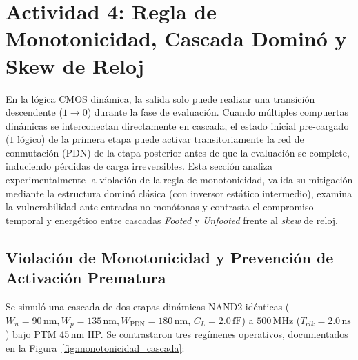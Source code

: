 \section{Actividad 4: Regla de Monotonicidad, Cascada Dominó y Skew de Reloj}
\label{sec:actividad4}

En la lógica CMOS dinámica, la salida solo puede realizar una transición descendente ($1 \to 0$) durante la fase de evaluación. Cuando múltiples compuertas dinámicas se interconectan directamente en cascada, el estado inicial pre-cargado ($1$ lógico) de la primera etapa puede activar transitoriamente la red de conmutación (PDN) de la etapa posterior antes de que la evaluación se complete, induciendo pérdidas de carga irreversibles. Esta sección analiza experimentalmente la violación de la regla de monotonicidad, valida su mitigación mediante la estructura dominó clásica (con inversor estático intermedio), examina la vulnerabilidad ante entradas no monótonas y contrasta el compromiso temporal y energético entre cascadas \textit{Footed} y \textit{Unfooted} frente al \textit{skew} de reloj.

\subsection{Violación de Monotonicidad y Prevención de Activación Prematura}
Se simuló una cascada de dos etapas dinámicas NAND2 idénticas ($W_n = 90\,\text{nm}, W_p = 135\,\text{nm}, W_{\text{PDN}} = 180\,\text{nm}$, $C_L = 2.0\,\text{fF}$) a $500\,\text{MHz}$ ($T_{clk} = 2.0\,\text{ns}$) bajo PTM 45\,nm HP. Se contrastaron tres regímenes operativos, documentados en la Figura~\ref{fig:monotonicidad_cascada}:

